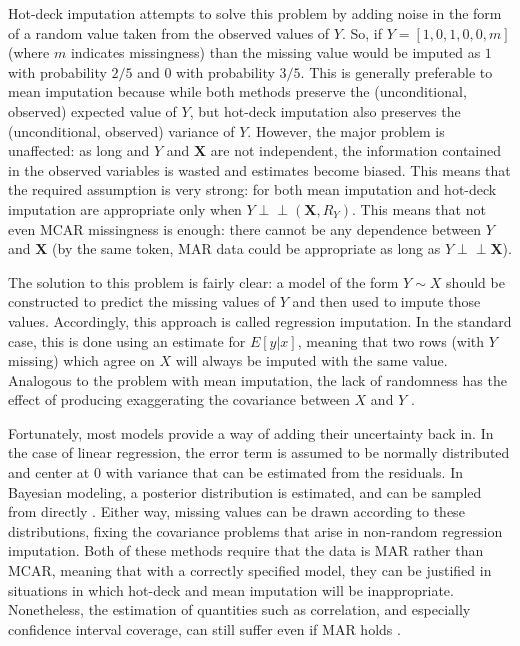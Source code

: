 \documentclass[12pt,twoside]{reedthesis}
\theoremstyle{definition}
\newcommand{\dsep}{\perp \!\!\!\perp}
\begin{document}
Hot-deck imputation attempts to solve this problem by adding noise in the form of a random value taken from the observed values of $Y$. So, if $Y = [1,0,1,0,0, m]$ (where $m$ indicates missingness) than the missing value would be imputed as $1$ with probability $2/5$ and $0$ with probability $3/5$. This is generally preferable to mean imputation because while both methods preserve the (unconditional, observed) expected value of $Y$, but hot-deck imputation also preserves  the (unconditional, observed) variance of $Y$. However, the major problem is unaffected: as long and $Y$ and $\mathbf{X}$ are not independent, the information contained in the observed variables is wasted and estimates become biased. This means that the required assumption is very strong: for both mean imputation and hot-deck imputation are appropriate only when $Y \dsep (\mathbf{X}, R_Y)$. This means that not even MCAR missingness is enough: there cannot be any dependence between $Y$ and $\mathbf{X}$ (by the same token, MAR data could be appropriate as long as $Y \dsep \mathbf{X}$).

The solution to this problem is fairly clear: a model of the form $Y \sim X$ should be constructed to predict the missing values of $Y$ and then used to impute those values. Accordingly, this approach is called regression imputation. In the standard case, this is done using an estimate for $E[y | x]$, meaning that two rows (with $Y$ missing) which agree on $X$ will always be imputed with the same value. Analogous to the problem with mean imputation, the lack of randomness has the effect of producing exaggerating the covariance between $X$ and $Y$ \citep{Schafer_2002}. 

Fortunately, most models provide a way of adding their uncertainty back in. In the case of linear regression, the error term is assumed to be normally distributed and center at $0$ with variance that can be estimated from the residuals. In Bayesian modeling, a posterior distribution is estimated, and can be sampled from directly \citep{Gelman_2006}. Either way, missing values can be drawn according to these distributions,  fixing the covariance problems that arise in non-random regression imputation. Both of these methods require that the data is MAR rather than MCAR, meaning that with a correctly specified model, they can be justified in situations in which hot-deck and mean imputation will be inappropriate. Nonetheless, the estimation of quantities such as correlation, and especially confidence interval coverage, can still suffer even if MAR holds \citep{Schafer_2002}.
 
\end{document}
